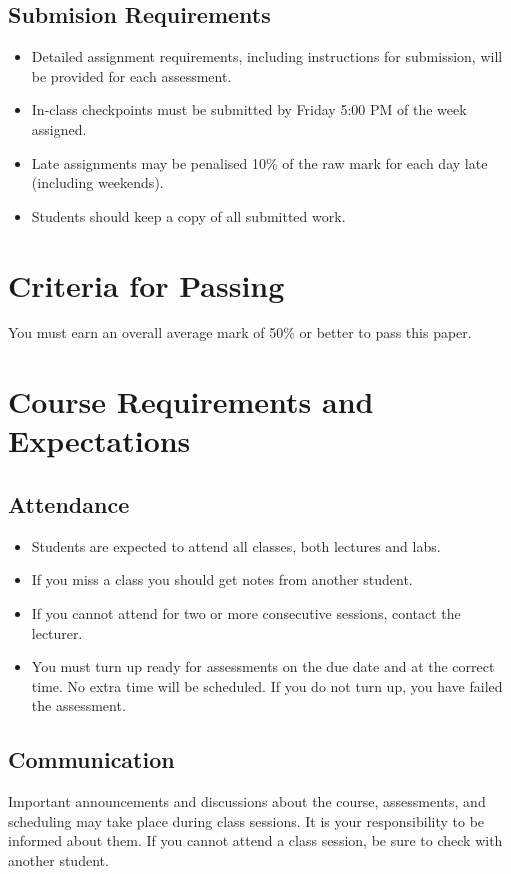 \documentclass{article}
\begin{document}
\subsection*{Submision Requirements}
\begin{itemize}
	\item Detailed assignment requirements, including instructions for submission, will be provided for each assessment.
        \item In-class checkpoints must be submitted by Friday 5:00 PM of the week assigned.
	\item Late assignments may be penalised 10\% of the raw mark for each day late (including weekends).
	\item Students should keep a copy of all submitted work.
\end{itemize}

\section*{Criteria for Passing}
You must earn an overall average mark of 50\% or better to pass this paper.

\section*{Course Requirements and Expectations}
\subsection*{Attendance}
\begin{itemize}
 \item Students are expected to attend all classes, both lectures and labs.
 \item If you miss a class you should get notes from another student.
 \item If you cannot attend for two or more consecutive sessions, contact the lecturer.
 \item You must turn up ready for assessments on the due date and at the correct time. No extra time will be scheduled. If you do not turn up, you have failed the assessment.
\end{itemize}

\subsection*{Communication}
Important announcements and discussions about the course, assessments, and scheduling may take place during class sessions.  It is your responsibility to be informed about them.  If you cannot attend a class session, be sure to check with another student.
\end{document}
